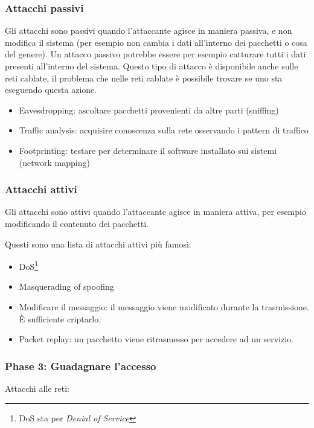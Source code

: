 \subsubsection{Attacchi passivi}

Gli attacchi sono passivi quando l'attaccante agisce in maniera passiva, e non 
modifica il sistema (per esempio non cambia i dati all'interno dei pacchetti o 
cosa del genere). Un attacco passivo potrebbe essere per esempio catturare 
tutti i dati presenti all'interno del sistema. Questo tipo di attacco è 
disponibile anche sulle reti cablate, il problema che nelle reti cablate è 
possibile trovare se uno sta eseguendo questa azione.

\begin{itemize}
\item Eavesdropping: ascoltare pacchetti provenienti da altre parti (sniffing)
\item Traffic analysis: acquisire conoscenza sulla rete osservando i pattern di 
traffico
\item Footprinting: testare per determinare il software installato sui sistemi 
(network mapping)
\end{itemize}

\subsubsection{Attacchi attivi}

Gli attacchi sono attivi quando l'attaccante agisce in maniera attiva, per 
esempio modificando il contenuto dei pacchetti.

Questi sono una lista di attacchi attivi più famosi:
\begin{itemize}
\item DoS\footnote{DoS sta per \textit{Denial of Service}}
\item Masquerading of spoofing
\item Modificare il messaggio: il messaggio viene modificato durante la 
trasmissione. È sufficiente criptarlo.
\item Packet replay: un pacchetto viene ritrasmesso per accedere ad un servizio.
\end{itemize}

\subsubsection{Phase 3: Guadagnare l'accesso}

Attacchi alle reti:

